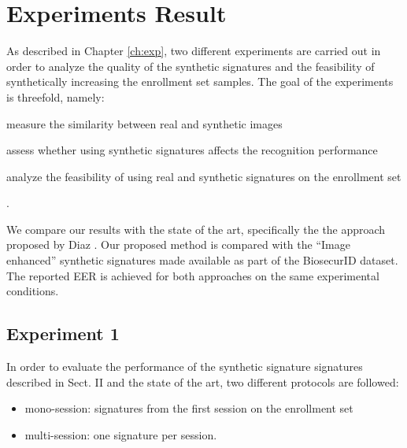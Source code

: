 
\chapter{Experiments Result}

As described in Chapter \ref{ch:exp}, two different experiments are
carried out in order to analyze the quality of the synthetic
signatures and the feasibility of synthetically increasing the
enrollment set samples. The goal of the experiments is threefold, namely:
\begin{inlinelist}
  \item measure the similarity between real
  and synthetic images
  \item assess whether using synthetic
  signatures affects the recognition performance
  \item analyze the feasibility of using real and synthetic signatures
  on the enrollment set
\end{inlinelist}.

We compare our results with the state of the art, specifically the the approach proposed by Diaz \cite{diaz2014generation}. Our proposed method is compared with the ``Image enhanced'' synthetic signatures made available as part of the BiosecurID \cite{biosecurid} dataset. The reported EER is achieved for both approaches on the same experimental conditions.

\section{Experiment 1}
In order to evaluate the performance of the synthetic signature signatures described in Sect. II and the state of the art, two different protocols are followed: 
\begin{itemize}
\item mono-session: signatures from the first session on the enrollment set
\item multi-session: one signature per session.
\end{itemize}



